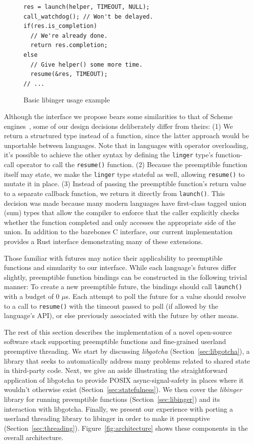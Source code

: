 \begin{figure}
\begin{verbatim}
res = launch(helper, TIMEOUT, NULL);
call_watchdog(); // Won't be delayed.
if(res.is_completion)
  // We're already done.
  return res.completion;
else
  // Give helper() some more time.
  resume(&res, TIMEOUT);
// ...
\end{verbatim}
\caption{Basic libinger usage example}
\label{fig:usage}
\end{figure}

Although the interface we propose bears some similarities to that of Scheme
engines~\cite{haynes:iucs1984}, some of our design decisions deliberately differ from
theirs:  (1) We return a structured type instead of a function, since the latter
approach would be unportable between languages.  Note that in languages with operator
overloading, it's possible to achieve the other syntax by defining the
\texttt{linger} type's function-call operator to call the \texttt{resume()} function.
(2) Because the preemptible function itself may state, we make the \texttt{linger}
type stateful as well, allowing \texttt{resume()} to mutate it in place.
(3) Instead of passing the preemptible function's return value to a separate callback
function, we return it directly from \texttt{launch()}.  This decision was made
because many modern languages have first-class tagged union (sum) types that allow
the compiler to enforce that the caller explicitly checks whether the function
completed and only accesses the appropriate side of the union.  In addition to the
barebones C interface, our current implementation provides a Rust interface
demonstrating many of these extensions.

Those familiar with futures may notice their applicability to preemptible functions
and simularity to our interface.  While each language's futures differ slightly,
preemptible function bindings can be constructed in the following trivial manner:
To create a new preemptible future, the bindings should call \texttt{launch()} with a
budget of 0 $\mu$s.  Each attempt to poll the future for a value should resolve to a
call to \texttt{resume()} with the timeout passed to poll (if allowed by the
language's API), or else previously associated with the future by other means.

The rest of this section describes the implementation of a novel open-source software
stack supporting preemptible functions and fine-grained userland preemptive
threading.  We start by discussing \textit{libgotcha} (Section~\ref{sec:libgotcha}),
a library that seeks to automatically address many problems related to shared state
in third-party code.  Next, we give an aside illustrating the straightforward
application of libgotcha to provide POSIX async-signal-safety in places where it
wouldn't otherwise exist (Section~\ref{sec:statefulness}).  We then cover the
\textit{libinger} library for running preemptible functions
(Section~\ref{sec:libinger}) and its interaction with libgotcha.  Finally, we present
our experience with porting a userland threading library to libinger in order to make
it preemptive (Section~\ref{sec:threading}).  Figure~\ref{fig:architecture} shows
these components in the overall architecture.

